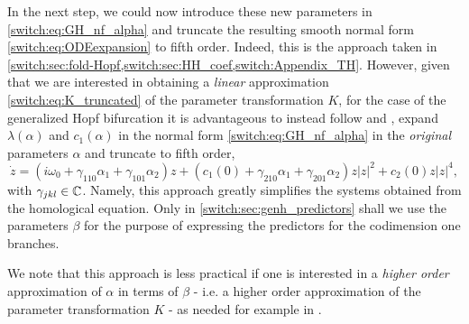 In the next step, we could now introduce these new parameters in \cref{switch:eq:GH_nf_alpha} and truncate the resulting smooth normal form \cref{switch:eq:ODEexpansion} to fifth order. Indeed, this is the approach taken in \cref{switch:sec:fold-Hopf,switch:sec:HH_coef,switch:Appendix_TH}. However, given that we are interested in obtaining a \emph{linear} approximation \cref{switch:eq:K_truncated} of the parameter transformation $K$, for the case of the generalized Hopf bifurcation it is advantageous to instead follow \cite{Kuznetsov2008} and \cite{Beyn2002149}, expand $\lambda(\alpha)$ and $c_{1}(\alpha)$ in the normal form \cref{switch:eq:GH_nf_alpha} in the \emph{original} parameters $\alpha$ and truncate to fifth order,
\begin{equation}
  \label{switch:eq:GH_nf_alpha_truncated}
  \dot{z}=\left(i\omega_{0}+\gamma_{110}\alpha_{1}+\gamma_{101}\alpha_{2}\right)z
  +\left(c_{1}(0)+\gamma_{210}\alpha_{1}+\gamma_{201}\alpha_{2}\right)z|z|^{2}+c_{2}(0)z|z|^{4},
\end{equation}
with $\gamma_{jkl} \in \mathbb{C}$. Namely, this approach greatly simplifies the systems obtained from the homological equation. Only in \cref{switch:sec:genh_predictors} shall we use the  parameters $\beta$ for the purpose of expressing the predictors for the codimension one branches.

\begin{remark}
  We note that this approach is less practical if one is interested in a \emph{higher order} approximation of $\alpha$ in terms of $\beta$ - i.e. a higher order approximation of the parameter transformation $K$ - as needed for example in \cite{Al-Hdaibat2016}.  
\end{remark}

